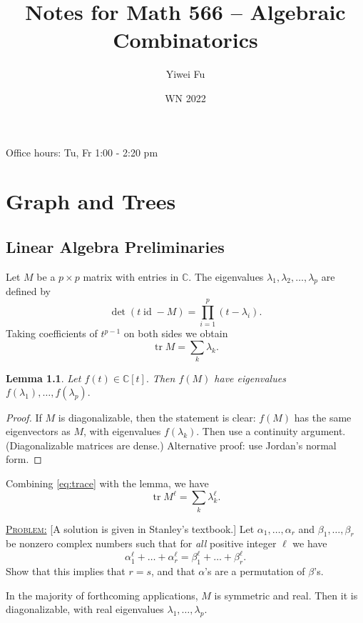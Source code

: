 \documentclass{report}
\newcommand{\C}{\mathbb{C}}
\def \id {\operatorname{id}}
\def \tr {\operatorname{tr}}
\newcommand{\fancyem}[1]{\underline{\textsc{#1}}}
\newtheorem{lemma}{Lemma}[section]
\theoremstyle{definition}
\theoremstyle{remark}
\numberwithin{equation}{section}
\begin{document}
\title{Notes for Math 566 -- Algebraic Combinatorics}
\author{Yiwei Fu}
\date{WN 2022}
\maketitle


\tableofcontents
Office hours: Tu, Fr 1:00 - 2:20 pm

\clearpage
{}

\chapter{Graph and Trees}
\section{Linear Algebra Preliminaries}
Let $M$ be a $p \times p$ matrix with entries in $\C$. The eigenvalues $\lambda_1, \lambda_2, \ldots, \lambda_p$ are defined by
\[
\det(t\id - M) = \prod_{i=1}^p (t - \lambda_i).
\]
Taking coefficients of $t^{p-1}$ on both sides we obtain
\begin{equation}\label{eq:trace}
\tr{M} = \sum_k \lambda_k.
\end{equation}


\begin{lemma}
Let $f(t) \in \C[t].$ Then $f(M)$ have eigenvalues $f(\lambda_1), \ldots, f(\lambda_p).$\end{lemma}
\begin{proof}
If $M$ is diagonalizable, then the statement is clear: $f(M)$ has the same eigenvectors as $M$, with eigenvalues $f(\lambda_k)$. Then use a continuity argument. (Diagonalizable matrices are dense.) Alternative proof: use Jordan’s normal form.
\end{proof}

Combining \eqref{eq:trace} with the lemma, we have
\begin{equation}\label{eq2}
\tr M^{\ell} = \sum_{k} \lambda_k^\ell.
\end{equation} 

\fancyem{Problem:} [A solution is given in Stanley’s textbook.] Let $\alpha_1, \ldots, \alpha_r$ and $\beta_1, \ldots, \beta_r$ be nonzero complex numbers such that for \emph{all} positive integer $\ell$ we have
\[
\alpha_1^\ell + \ldots + \alpha_r^\ell = \beta_1^\ell + \ldots + \beta_r^\ell.
\]
Show that this implies that $r=s$, and that $\alpha$'s are a permutation of $\beta$'s.

In the majority of forthcoming applications, $M$ is symmetric and real. Then it is diagonalizable, with real eigenvalues $\lambda_1, \ldots, \lambda_p$.
\end{document}
